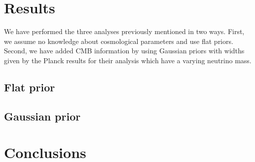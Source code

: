 \section{Results}
\label{chapter:7:results}

We have performed the three analyses previously mentioned in two ways. First, we assume no knowledge about cosmological parameters and use flat priors. Second, we have added CMB information by using Gaussian priors with widths given by the Planck results for their analysis which have a varying neutrino mass. 

\subsection{Flat prior}


\subsection{Gaussian prior}


\section{Conclusions}
\label{chapter:7:conclusions}




